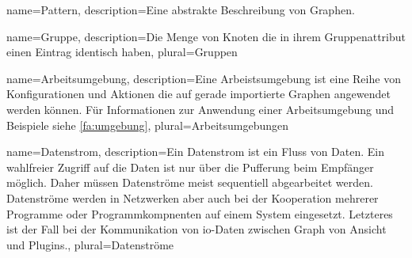 {
  name=Pattern,
  description={Eine abstrakte Beschreibung von Graphen.}
}

{
  name=Gruppe,
  description={Die Menge von Knoten die in ihrem Gruppenattribut einen Eintrag identisch haben},
  plural=Gruppen
}

{
  name=Arbeitsumgebung,
  description={Eine Arbeistsumgebung ist eine Reihe von Konfigurationen und Aktionen die auf gerade importierte Graphen angewendet werden können.
    Für Informationen zur Anwendung einer Arbeitsumgebung und Beispiele siehe \ref{fa:umgebung}},
  plural=Arbeitsumgebungen
}

{
  name=Datenstrom,
  description={Ein Datenstrom ist ein Fluss von Daten. Ein wahlfreier Zugriff auf die Daten ist nur über die Pufferung beim Empfänger möglich. Daher müssen Datenströme meist sequentiell abgearbeitet werden. Datenströme werden in Netzwerken aber auch bei der Kooperation mehrerer Programme oder Programmkompnenten auf einem System eingesetzt. Letzteres ist der Fall bei der Kommunikation von \gls{io}-Daten zwischen Graph von Ansicht und Plugins.},
  plural=Datenströme
}




